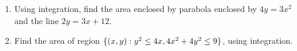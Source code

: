 \begin{enumerate}
\item Using integration, find the area enclosed by parabola enclosed by $4y = 3x^2$ and the line $2y=3x+12$.

\item Find the area of region $\{ \left(x,y\right) : y^2 \leq 4x , 4x^2 +4y^2 \leq 9 \}$, using integration.
\end{enumerate}
